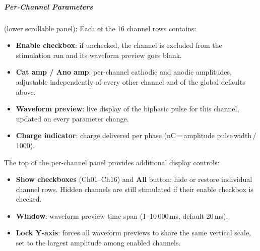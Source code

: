 \subparagraph{Per-Channel Parameters} (lower scrollable panel):
Each of the 16 channel rows contains:
\begin{itemize}
    \item \textbf{Enable checkbox}: if unchecked, the channel is excluded from
    the stimulation run and its waveform preview goes blank.

    \item \textbf{Cat amp / Ano amp}: per-channel cathodic and anodic
    amplitudes, adjustable independently of every other channel and of the
    global defaults above.

    \item \textbf{Waveform preview}: live display of the biphasic pulse for
    this channel, updated on every parameter change.

    \item \textbf{Charge indicator}: charge delivered per phase
    (nC\,=\,amplitude\,\texttimes\,pulse\,width\,/\,1000).
\end{itemize}

The top of the per-channel panel provides additional display controls:
\begin{itemize}
    \item \textbf{Show checkboxes} (Ch01--Ch16) and \textbf{All} button:
    hide or restore individual channel rows. Hidden channels are still
    stimulated if their enable checkbox is checked.
    \item \textbf{Window}: waveform preview time span (1--10\,000\,ms,
    default 20\,ms).
    \item \textbf{Lock Y-axis}: forces all waveform previews to share the
    same vertical scale, set to the largest amplitude among enabled channels.
\end{itemize}